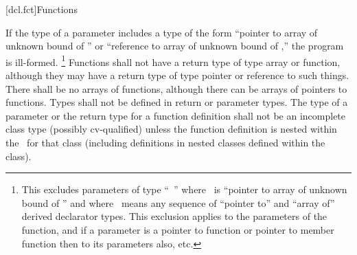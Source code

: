 \documentclass[american]{book}
\begin{document}
\begin{paras}
[dcl.fct]{Functions}

\setcounter{Paras}{5}
\pnum
If the type of a parameter includes a type of the form
``pointer to array of unknown bound of '' or
``reference to array of unknown bound of ,''
the program is ill-formed.%
\footnote{
This excludes parameters of type
``\ '' where \ is
``pointer to array of unknown bound of '' and where
\ means any sequence of ``pointer to'' and
``array of'' derived declarator types.
This exclusion applies to the parameters of the function,
and if a parameter is a pointer to function
or pointer to member function then to its
parameters also, etc.
}
%
%
Functions shall not have a return type of type array or function,
although they may have a return type of type pointer or reference to such things.
There shall be no arrays of functions, although there can be arrays of pointers
to functions.
Types shall not be defined in return or parameter types.
The type of a parameter or the return type for a function
definition shall not be an incomplete class type (possibly
cv-qualified) unless the function definition is nested
within the
\ 
for that class (including definitions in nested classes
defined within the class).
\end{paras}
\end{document}

